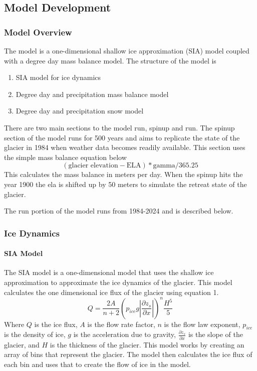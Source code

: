 \documentclass{article}
\begin{document}
\subsection{Model Development}
\subsubsection{Model Overview}
The model is a one-dimensional shallow ice approximation (SIA) model coupled with a degree day mass balance model. The structure of the model is
\begin{enumerate}
    \item SIA model for ice dynamics
    \item Degree day and precipitation mass balance model
    \item Degree day and precipitation snow model
\end{enumerate}

There are two main sections to the model run, spinup and run. The spinup section of the model runs for 500 years and aims to replicate the 
state of the glacier in 1984 when weather data becomes readily available. This section uses the simple mass balance equation below
\begin{equation}(\text{glacier elevation}-\text{ELA})*\text{gamma}/365.25\end{equation}
This calculates the mass balance in meters per day. When the spinup hits the year 1900 the ela is shifted up by 50 meters to simulate the 
retreat state of the glacier. 

The run portion of the model runs from 1984-2024 and is described below.

\subsubsection{Ice Dynamics}
\paragraph{SIA Model}

The SIA model is a one-dimensional model that uses the shallow ice approximation to approximate the ice dynamics of the glacier. This model 
calculates the one dimensional ice flux of the glacier using equation 1. 
\begin{equation}Q=\frac{2A}{n+2}(p_{ice}g|\frac{\partial z_s}{\partial x}|)^n\frac{H^5}{5}\end{equation}
Where $Q$ is the ice flux, $A$ is the flow rate factor, $n$ is the flow law exponent, $p_{ice}$ is the density of ice, $g$ is the acceleration
due to gravity, $\frac{\partial z_s}{\partial x}$ is the slope of the glacier, and $H$ is the thickness of the glacier. This model works by 
creating an array of bins that represent the glacier. The model then calculates the ice flux of each bin and uses that to create the flow of 
ice in the model. 
\end{document}
